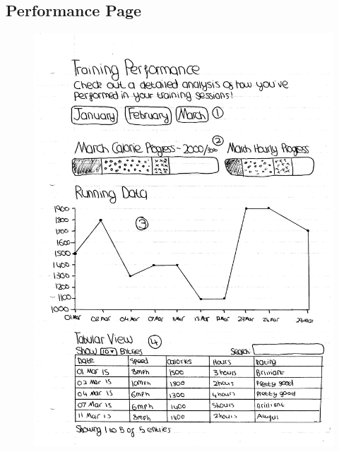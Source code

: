 \documentclass{article}[12pt,a4paper]
\begin{document}
\subsection{Performance Page}
\begin{figure}[h!]
  \includegraphics[scale=0.55]{design_ui/user_performance}
\end{figure}
\clearpage
\end{document}
